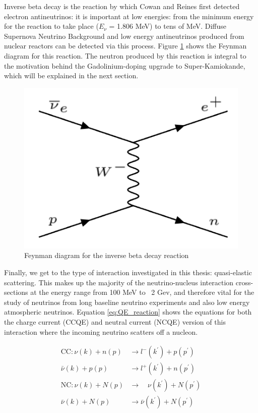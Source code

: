 Inverse beta decay is the reaction by which Cowan and Reines first detected electron antineutrinos: it is important at low energies: from the minimum energy for the reaction to take place ($E_{\nu}$ = 1.806 MeV) to tens of MeV. Diffuse Supernova Neutrino Background and low energy antineutrinos produced from nuclear reactors can be detected via this process. Figure \ref{fig:IBD_feynman} shows the Feynman diagram for this reaction. The neutron produced by this reaction is integral to the motivation behind the Gadolinium-doping upgrade to Super-Kamiokande, which will be explained in the next section.

\begin{figure}
    \includegraphics[width=\textwidth]{Figures/IBD_feynman.png}
    \caption{Feynman diagram for the inverse beta decay reaction}
    \label{fig:IBD_feynman}
\end{figure}

Finally, we get to the type of interaction investigated in this thesis: quasi-elastic scattering. This makes up the majority of the neutrino-nucleus interaction cross-sections at the energy range from 100 MeV to ~2 Gev, and therefore vital for the study of neutrinos from long baseline neutrino experiments and also low energy atmospheric neutrinos. Equation \ref{eq:QE_reaction} shows the equations for both the charge current (CCQE) and neutral current (NCQE) version of this interaction where the incoming neutrino scatters off a nucleon.

$$
\begin{aligned}
\mathrm{CC}: \nu(k)+n(p) & \rightarrow l^{-}\left(k^{\prime}\right)+p\left(p^{\prime}\right) \\
\bar{\nu}(k)+p(p) & \rightarrow l^{+}\left(k^{\prime}\right)+n\left(p^{\prime}\right) \\
\mathrm{NC}: \nu(k)+N(p) & \rightarrow \quad \nu\left(k^{\prime}\right)+N\left(p^{\prime}\right) \\
\bar{\nu}(k)+N(p) & \rightarrow \bar{\nu}\left(k^{\prime}\right)+N\left(p^{\prime}\right)
\end{aligned}
\label{eq:QE_reaction}
$$

